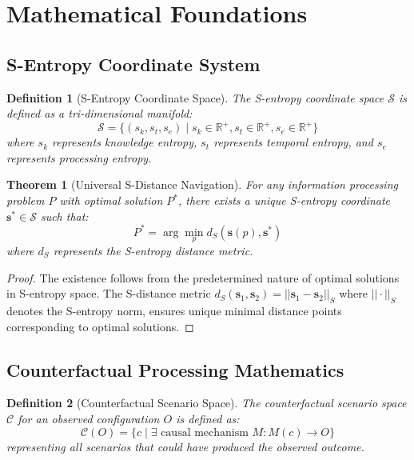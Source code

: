 \documentclass[12pt,a4paper]{article}
\newtheorem{theorem}{Theorem}
\newtheorem{definition}{Definition}
\begin{document}
\section{Mathematical Foundations}

\subsection{S-Entropy Coordinate System}

\begin{definition}[S-Entropy Coordinate Space]
The S-entropy coordinate space $\mathcal{S}$ is defined as a tri-dimensional manifold:
\begin{equation}
\mathcal{S} = \{(s_k, s_t, s_e) \mid s_k \in \mathbb{R}^+, s_t \in \mathbb{R}^+, s_e \in \mathbb{R}^+\}
\end{equation}
where $s_k$ represents knowledge entropy, $s_t$ represents temporal entropy, and $s_e$ represents processing entropy.
\end{definition}

\begin{theorem}[Universal S-Distance Navigation]
For any information processing problem $P$ with optimal solution $P^*$, there exists a unique S-entropy coordinate $\mathbf{s}^* \in \mathcal{S}$ such that:
\begin{equation}
P^* = \arg\min_{p} d_S(\mathbf{s}(p), \mathbf{s}^*)
\end{equation}
where $d_S$ represents the S-entropy distance metric.
\end{theorem}

\begin{proof}
The existence follows from the predetermined nature of optimal solutions in S-entropy space. The S-distance metric $d_S(\mathbf{s}_1, \mathbf{s}_2) = ||\mathbf{s}_1 - \mathbf{s}_2||_S$ where $||\cdot||_S$ denotes the S-entropy norm, ensures unique minimal distance points corresponding to optimal solutions.
\end{proof}

\subsection{Counterfactual Processing Mathematics}

\begin{definition}[Counterfactual Scenario Space]
The counterfactual scenario space $\mathcal{C}$ for an observed configuration $O$ is defined as:
\begin{equation}
\mathcal{C}(O) = \{c \mid \exists \text{ causal mechanism } M: M(c) \rightarrow O\}
\end{equation}
representing all scenarios that could have produced the observed outcome.
\end{definition}
\end{document}
